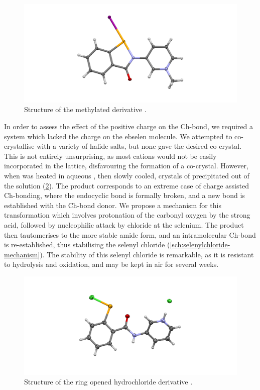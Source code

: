 \begin{refsection}
\begin{figure}
    \centering
    \includegraphics[width=\linewidth]{Figures/3py-ebs-mei.pdf}
    \caption{Structure of the methylated derivative .}
    \label{fig:3py-ebs-mei}
\end{figure}

In order to assess the effect of the positive charge on the Ch-bond, we required a system which lacked the charge on the ebselen molecule.
We attempted to co-crystallise  with a variety of halide salts, but none gave the desired co-crystal.
This is not entirely unsurprising, as most cations would not be easily incorporated in the lattice, disfavouring the formation of a co-crystal.
However, when  was heated in aqueous , then slowly cooled, crystals of  precipitated out of the solution (\cref{fig:3py-ebs-hcl}).
The product  corresponds to an extreme case of charge assisted Ch-bonding, where the endocyclic  bond is formally broken, and a new bond is established with the Ch-bond donor.
We propose a mechanism for this transformation which involves protonation of the carbonyl oxygen by the strong acid, followed by nucleophilic attack by chloride at the selenium.
The product then tautomerises to the more stable amide form, and an intramolecular Ch-bond is re-established, thus stabilising the selenyl chloride (\cref{sch:selenylchloride-mechanism}).
The stability of this selenyl chloride is remarkable, as it is resistant to hydrolysis and oxidation, and may be kept in air for several weeks.

\begin{figure}
    \centering
    \includegraphics[width=\linewidth]{Figures/3py-ebs-hcl.pdf}
    \caption{Structure of the ring opened hydrochloride derivative .}
    \label{fig:3py-ebs-hcl}
\end{figure}

\printbibliography[heading=subbibliography]

\end{refsection}
